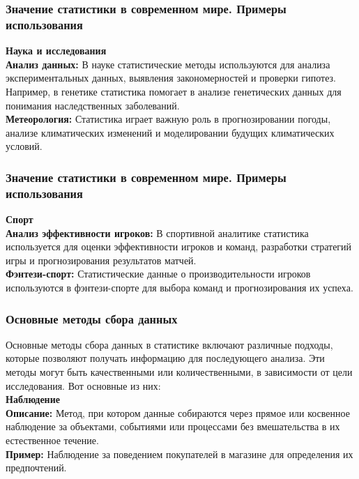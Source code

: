\documentclass[aspectratio=169]{beamer}
\begin{document}
\begin{frame}
\frametitle{Значение статистики в современном мире. Примеры использования}
\textbf{Наука и исследования}
\newline\\
\textbf{Анализ данных:} В науке статистические методы используются для анализа экспериментальных данных, выявления закономерностей и проверки гипотез. Например, в генетике статистика помогает в анализе генетических данных для понимания наследственных заболеваний.
\newline\\
\textbf{Метеорология:} Статистика играет важную роль в прогнозировании погоды, анализе климатических изменений и моделировании будущих климатических условий.
\end{frame}

\begin{frame}
\frametitle{Значение статистики в современном мире. Примеры использования}
\textbf{Спорт}
\newline\\
\textbf{Анализ эффективности игроков:} В спортивной аналитике статистика используется для оценки эффективности игроков и команд, разработки стратегий игры и прогнозирования результатов матчей.
\newline\\
\textbf{Фэнтези-спорт:} Статистические данные о производительности игроков используются в фэнтези-спорте для выбора команд и прогнозирования их успеха.
\end{frame}

\begin{frame}
\frametitle{Основные методы сбора данных}
Основные методы сбора данных в статистике включают различные подходы, которые позволяют получать информацию для последующего анализа. Эти методы могут быть качественными или количественными, в зависимости от цели исследования. Вот основные из них:
\newline\\
\textbf{Наблюдение}
\newline\\
\textbf{Описание:} Метод, при котором данные собираются через прямое или косвенное наблюдение за объектами, событиями или процессами без вмешательства в их естественное течение.
\newline\\
\textbf{Пример:} Наблюдение за поведением покупателей в магазине для определения их предпочтений.
\end{frame}
\end{document}
